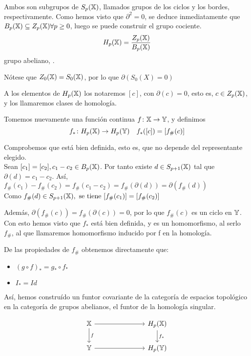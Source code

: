 Ambos son subgrupos de $S_p({\mathbb X})$, llamados grupos de los ciclos y los bordes, respectivamente. Como hemos visto que $\partial^2 = 0$, se deduce
inmediatamente que $B_p({\mathbb X}) \subseteq Z_p({\mathbb X})  \forall p \geq 0$, luego se puede construir el grupo cociente.
\begin{equation*}
  H_p({\mathbb X}) = \frac{\displaystyle Z_p({\mathbb X})}{\displaystyle B_p({\mathbb X})}
\end{equation*}
grupo abeliano, \underline{}.

\begin{remark}
  Nótese que $Z_0({\mathbb X}) = S_0({\mathbb X})$, por lo que $\partial(S_0(X) = 0)$
\end{remark}

A los elementos de $H_p({\mathbb X})$ los notaremos $[c]$, con $\partial(c) = 0$, esto es, $c \in Z_p({\mathbb X})$, y los llamaremos clases de homología.

Tomemos nuevamente una función continua $f \colon {\mathbb X} \to {\mathbb Y}$, y definimos
\[ f_* \colon H_p({\mathbb X}) \to H_p({\mathbb Y}) \quad f_*([c]) = [f_\#(c)]  \]

Comprobemos que está bien definida, esto es, que no depende del representante elegido. \\
Sean $[c_1] = [c_2], c_1 - c_2 \in B_p({\mathbb X})$. Por tanto existe $d \in S_{p+1}({\mathbb X})$ tal que $\partial(d) = c_1 - c_2.$ Así,
$f_\#(c_1) - f_\#(c_2) = f_\#(c_1 - c_2) = f_\#(\partial(d)) = \partial(f_\#(d))$ \\
Como $f_\#(d) \in S_{p+1}({\mathbb X}), \text{ se tiene } [f_\#(c_1)] = [f_\#(c_2)]$

Además, $\partial(f_\#(c)) = f_\#(\partial(c)) = 0$, por lo que $f_\#(c)$ es un ciclo en ${\mathbb Y}$. Con esto hemos visto que $f_*$ está bien definida,
y es un homomorfismo, al serlo $f_\#$, al que llamaremos homomorfismo inducido por f en la homología.

De las propiedades de $f_\#$ obtenemos directamente que:
\begin{itemize}
  \item $(g \circ f)_* = g_* \circ f_*$
  \item $I_* = Id$
\end{itemize}

Así, hemos construído un funtor covariante de la categoría de espacios topológico en la categoría de grupos abelianos,
el funtor de la homología singular.

\begin{displaymath}
  \begin{tikzcd}
    \X \arrow{r} \arrow{d}{f} & [5em] H_p(\X) \arrow{d}{f_*} \\
    \Y \arrow{r}  & H_p(\Y)
  \end{tikzcd}
\end{displaymath}

